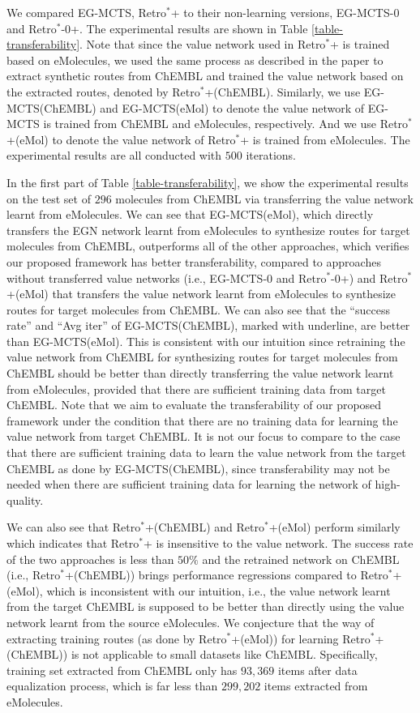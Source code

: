 \documentclass[sn-mathphys,Numbered]{sn-jnl}
\begin{document}
We compared EG-MCTS, Retro$^*$+ to their non-learning versions, EG-MCTS-0 and Retro$^*$-0+. The experimental results are shown in Table \ref{table-transferability}.
Note that since the value network used in Retro$^*$+ is trained based on eMolecules, we used the same process as described in the paper \cite{retro2020} to extract synthetic routes from ChEMBL and trained the value network based on the extracted routes, denoted by Retro$^*$+(ChEMBL). Similarly, we use EG-MCTS(ChEMBL) and EG-MCTS(eMol) to denote the value network of EG-MCTS is trained from ChEMBL and eMolecules, respectively. And we use Retro$^*$+(eMol) to denote the value network of Retro$^*$+ is trained from eMolecules. The experimental results are all conducted with $500$ iterations.


In the first part of Table \ref{table-transferability}, we show the experimental results on the test set of $296$ molecules from ChEMBL via transferring the value network learnt from eMolecules. We can see that EG-MCTS(eMol), which directly transfers the EGN network learnt from eMolecules to synthesize routes for target molecules from ChEMBL, outperforms all of the other approaches, which verifies our proposed framework has better transferability, compared to approaches without transferred value networks (i.e., EG-MCTS-0 and Retro$^*$-0+) and Retro$^*$+(eMol) that transfers the value network learnt from eMolecules to synthesize routes for target molecules from ChEMBL. We can also see that the ``success rate'' and ``Avg iter'' of EG-MCTS(ChEMBL), marked with underline, are better than EG-MCTS(eMol). This is consistent with our intuition since retraining the value network from ChEMBL for synthesizing routes for target molecules from ChEMBL should be better than directly transferring the value network learnt from eMolecules, provided that there are sufficient training data from target ChEMBL. Note that we aim to evaluate the transferability of our proposed framework under the condition that there are no training data for learning the value network from target ChEMBL. It is not our focus to compare to the case that there are sufficient training data to learn the value network from the target ChEMBL as done by EG-MCTS(ChEMBL), since transferability may not be needed when there are sufficient training data for learning the network of high-quality. 


We can also see that Retro$^*$+(ChEMBL) and Retro$^*$+(eMol) perform similarly which indicates that Retro$^*$+ is insensitive to the value network.
The success rate of the two approaches is less than $50\%$ and the retrained network on ChEMBL (i.e., Retro$^*$+(ChEMBL)) brings performance regressions compared to Retro$^*$+(eMol), which is inconsistent with our intuition, i.e., the value network learnt from the target ChEMBL is supposed to be better than directly using the value network learnt from the source eMolecules.
We conjecture that the way of extracting training routes (as done by Retro$^*$+(eMol)) for learning Retro$^*$+(ChEMBL)) is not applicable to small datasets like ChEMBL.
Specifically, training set extracted from ChEMBL only has $93,369$ items after data equalization process, which is far less than $299,202$ items extracted from eMolecules.
\end{document}
